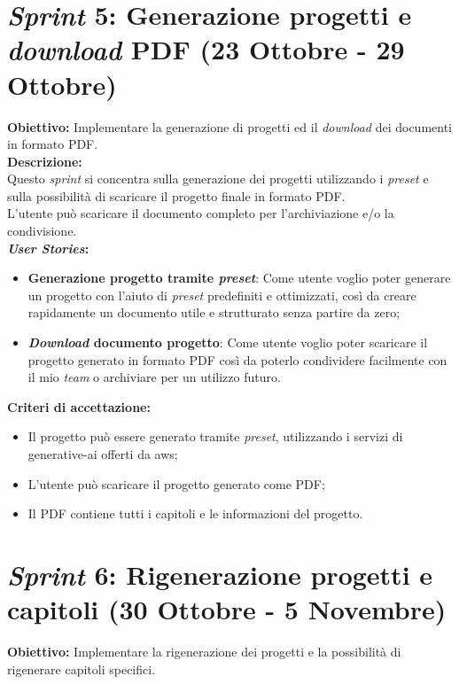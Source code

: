 \section*{\textit{Sprint} 5: Generazione progetti e \textit{download} PDF (23 Ottobre - 29 Ottobre)}
\textbf{Obiettivo:} Implementare la generazione di progetti ed il \textit{download} dei documenti in formato PDF.\\

\noindent \textbf{Descrizione:}\\
\noindent Questo \textit{sprint} si concentra sulla generazione dei progetti utilizzando i \textit{preset} e sulla possibilità di scaricare il progetto finale in formato PDF.\\
L'utente può scaricare il documento completo per l'archiviazione e/o la condivisione.\\

\noindent \textbf{\textit{User Stories}:} 
\begin{itemize}
    \item \textbf{Generazione progetto tramite \textit{preset}}: Come utente voglio poter generare un progetto con l'aiuto di \textit{preset} predefiniti e ottimizzati, così da creare rapidamente un documento utile e strutturato senza partire da zero;
    \item \textbf{\textit{Download} documento progetto}: Come utente voglio poter scaricare il progetto generato in formato PDF così da poterlo condividere facilmente con il mio \textit{team} o archiviare per un utilizzo futuro.
\end{itemize}

\noindent \textbf{Criteri di accettazione:}  
\begin{itemize}
    \item Il progetto può essere generato tramite \textit{preset}, utilizzando i servizi di \gls{generative-ai} offerti da \gls{aws};
    \item L'utente può scaricare il progetto generato come PDF;
    \item Il PDF contiene tutti i capitoli e le informazioni del progetto.
\end{itemize}

\pagebreak
\section*{\textit{Sprint} 6: Rigenerazione progetti e capitoli (30 Ottobre - 5 Novembre)}
\textbf{Obiettivo:} Implementare la rigenerazione dei progetti e la possibilità di rigenerare capitoli specifici.\\

